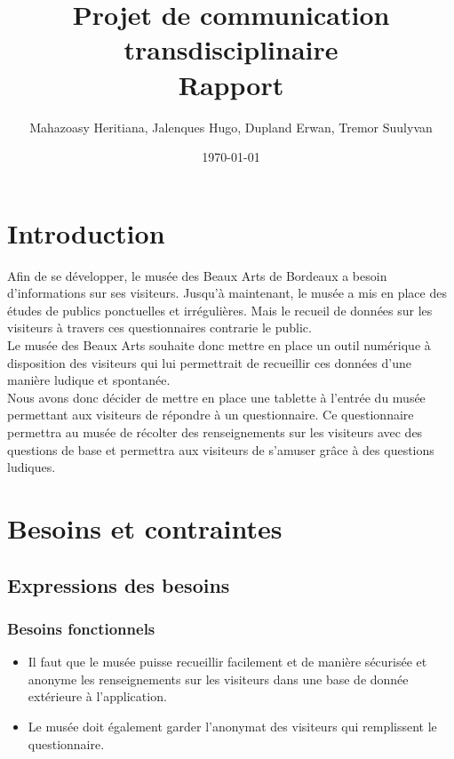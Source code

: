 \documentclass[12]{report}
\title{\textbf{Projet de communication transdisciplinaire \\ Rapport}}
\author{Mahazoasy Heritiana, Jalenques Hugo, Dupland Erwan, Tremor Suulyvan}
\date\today{}
\begin{document}
\renewcommand{\contentsname}{Sommaire}

\maketitle
\tableofcontents

  \chapter{Introduction}

  Afin de se développer, le musée des Beaux Arts de Bordeaux a besoin d'informations sur ses visiteurs. Jusqu'à maintenant, le musée a mis en place des études de publics ponctuelles et irrégulières. Mais le recueil de données sur les visiteurs à travers ces questionnaires contrarie le public.
  \\

  Le musée des Beaux Arts souhaite donc mettre en place un outil numérique à disposition des visiteurs qui lui permettrait de recueillir ces données d'une manière ludique et spontanée. \\

  Nous avons donc décider de mettre en place une tablette à l'entrée du musée permettant aux visiteurs de répondre à un questionnaire. Ce questionnaire permettra au musée de récolter des renseignements sur les visiteurs avec des questions de base et permettra aux visiteurs de s'amuser grâce à des questions ludiques.

  \chapter{Besoins et contraintes}

  \section{Expressions des besoins}

  \subsection{Besoins fonctionnels}

  \begin{itemize}
    \item Il faut que le musée puisse recueillir facilement et de manière sécurisée et anonyme les renseignements sur les visiteurs dans une base de donnée extérieure à l'application.
    \item Le musée doit également garder l'anonymat des visiteurs qui remplissent le questionnaire.
  \end{itemize}
\end{document}
